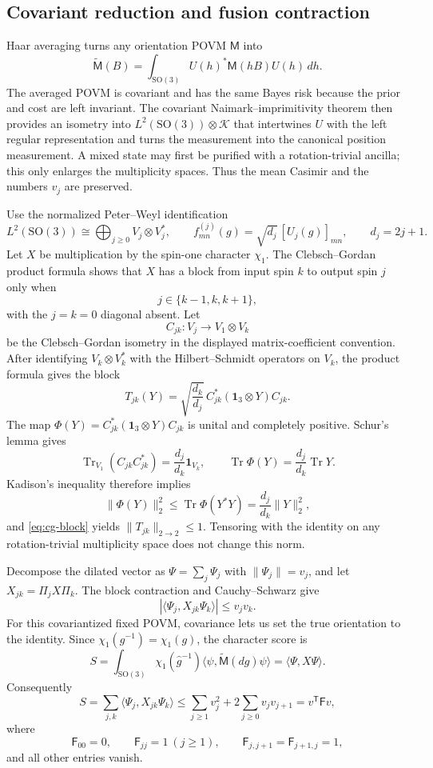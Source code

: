 \documentclass[11pt]{article}
\theoremstyle{remark}
\newcommand{\cK}{\mathcal K}
\newcommand{\1}{\mathbf 1}
\newcommand{\Tr}{\operatorname{Tr}}
\newcommand{\SO}{\mathrm{SO}(3)}
\begin{document}
\subsection*{Covariant reduction and fusion contraction}

Haar averaging turns any orientation POVM $\mathsf M$ into
\[
  \widetilde{\mathsf M}(B)
  =\int_{\SO}U(h)^*\mathsf M(hB)U(h)\,dh.
\]
The averaged POVM is covariant and has the same Bayes risk because the prior
and cost are left invariant. The covariant Naimark--imprimitivity theorem
\cite{holevo1982} then provides an isometry into
$L^2(\SO)\otimes\cK$ that intertwines $U$ with the left regular
representation and turns the measurement into the canonical position
measurement. A mixed state may first be purified with a rotation-trivial
ancilla; this only enlarges the multiplicity spaces. Thus the mean Casimir and
the numbers $v_j$ are preserved.

Use the normalized Peter--Weyl identification
\[
  L^2(\SO)\cong\bigoplus_{j\geq0}V_j\otimes V_j^*,
  \qquad
  f_{mn}^{(j)}(g)=\sqrt{d_j}\,[U_j(g)]_{mn},
  \qquad d_j=2j+1.
\]
Let $X$ be multiplication by the spin-one character $\chi_1$. The
Clebsch--Gordan product formula shows that $X$ has a block from input spin $k$
to output spin $j$ only when
\[
  j\in\{k-1,k,k+1\},
\]
with the $j=k=0$ diagonal absent. Let
\[
  C_{jk}:V_j\longrightarrow V_1\otimes V_k
\]
be the Clebsch--Gordan isometry in the displayed matrix-coefficient convention.
After identifying $V_k\otimes V_k^*$ with the Hilbert--Schmidt operators on
$V_k$, the product formula gives the block
\begin{equation}
  T_{jk}(Y)
  =\sqrt{\frac{d_k}{d_j}}\,
    C_{jk}^*(\1_3\otimes Y)C_{jk}.
  \label{eq:cg-block}
\end{equation}
The map $\Phi(Y)=C_{jk}^*(\1_3\otimes Y)C_{jk}$ is unital and completely
positive. Schur's lemma gives
\[
  \Tr_{V_1}(C_{jk}C_{jk}^*)=\frac{d_j}{d_k}\1_{V_k},
  \qquad
  \Tr\Phi(Y)=\frac{d_j}{d_k}\Tr Y.
\]
Kadison's inequality therefore implies
\[
  \lVert\Phi(Y)\rVert_2^2
  \leq\Tr\Phi(Y^*Y)
  =\frac{d_j}{d_k}\lVert Y\rVert_2^2,
\]
and \cref{eq:cg-block} yields $\lVert T_{jk}\rVert_{2\to2}\leq1$.
Tensoring with the identity on any rotation-trivial multiplicity space does
not change this norm.

Decompose the dilated vector as $\Psi=\sum_j\Psi_j$ with
$\lVert\Psi_j\rVert=v_j$, and let $X_{jk}=\Pi_jX\Pi_k$. The block contraction
and Cauchy--Schwarz give
\[
  |\langle\Psi_j,X_{jk}\Psi_k\rangle|\leq v_jv_k.
\]
For this covariantized fixed POVM, covariance lets us set the true orientation
to the identity. Since $\chi_1(g^{-1})=\chi_1(g)$, the character score is
\[
  S
  =\int_{\SO}\chi_1(\hat g^{-1})
      \langle\psi,\widetilde{\mathsf M}(d\hat g)\psi\rangle
  =\langle\Psi,X\Psi\rangle.
\]
Consequently
\begin{equation}
  S=\sum_{j,k}\langle\Psi_j,X_{jk}\Psi_k\rangle
  \leq\sum_{j\geq1}v_j^2+2\sum_{j\geq0}v_jv_{j+1}
  =v^{\mathsf T}\mathsf Fv,
  \label{eq:fusion-score}
\end{equation}
where
\[
  \mathsf F_{00}=0,
  \qquad \mathsf F_{jj}=1\ (j\geq1),
  \qquad \mathsf F_{j,j+1}=\mathsf F_{j+1,j}=1,
\]
and all other entries vanish.
\end{document}
